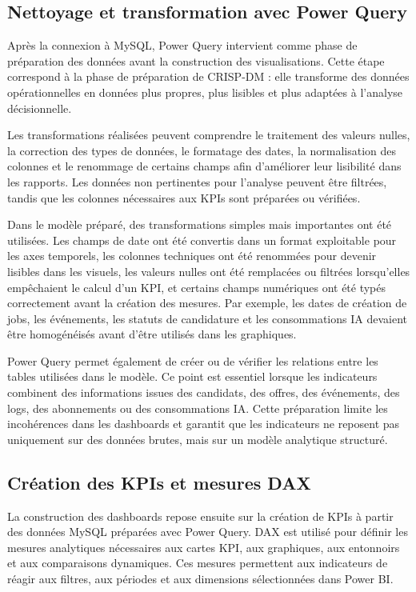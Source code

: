 \subsection{Nettoyage et transformation avec Power Query}

Après la connexion à MySQL, Power Query \cite{powerquery_docs} intervient comme phase de préparation des données avant la construction des visualisations. Cette étape correspond à la phase de préparation de CRISP-DM : elle transforme des données opérationnelles en données plus propres, plus lisibles et plus adaptées à l'analyse décisionnelle.

Les transformations réalisées peuvent comprendre le traitement des valeurs nulles, la correction des types de données, le formatage des dates, la normalisation des colonnes et le renommage de certains champs afin d'améliorer leur lisibilité dans les rapports. Les données non pertinentes pour l'analyse peuvent être filtrées, tandis que les colonnes nécessaires aux KPIs sont préparées ou vérifiées.

Dans le modèle préparé, des transformations simples mais importantes ont été utilisées. Les champs de date ont été convertis dans un format exploitable pour les axes temporels, les colonnes techniques ont été renommées pour devenir lisibles dans les visuels, les valeurs nulles ont été remplacées ou filtrées lorsqu'elles empêchaient le calcul d'un KPI, et certains champs numériques ont été typés correctement avant la création des mesures. Par exemple, les dates de création de jobs, les événements, les statuts de candidature et les consommations IA devaient être homogénéisés avant d'être utilisés dans les graphiques.

Power Query permet également de créer ou de vérifier les relations entre les tables utilisées dans le modèle. Ce point est essentiel lorsque les indicateurs combinent des informations issues des candidats, des offres, des événements, des logs, des abonnements ou des consommations IA. Cette préparation limite les incohérences dans les dashboards et garantit que les indicateurs ne reposent pas uniquement sur des données brutes, mais sur un modèle analytique structuré.

\subsection{Création des KPIs et mesures DAX}

La construction des dashboards repose ensuite sur la création de KPIs à partir des données MySQL préparées avec Power Query. DAX \cite{dax_docs} est utilisé pour définir les mesures analytiques nécessaires aux cartes KPI, aux graphiques, aux entonnoirs et aux comparaisons dynamiques. Ces mesures permettent aux indicateurs de réagir aux filtres, aux périodes et aux dimensions sélectionnées dans Power BI.

